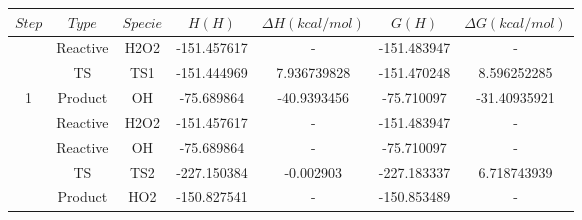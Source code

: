 \begin{tabular}{|c|c|c|c|c|c|c|}
    \hline
    \rowcolor[HTML]{000000} 
    {\color[HTML]{FFFFFF} \textbf{$Step$}} & {\color[HTML]{FFFFFF} \textbf{$Type$}} & {\color[HTML]{FFFFFF} \textbf{$Specie$}} & {\color[HTML]{FFFFFF} \textbf{$H(H)$}} & {\color[HTML]{FFFFFF} \textbf{$\Delta H (kcal/mol)$}} & {\color[HTML]{FFFFFF} \textbf{$G(H)$}} & {\color[HTML]{FFFFFF} \textbf{$\Delta G(kcal/mol)$}} \\ \hline
                                         & Reactive                             & H2O2                                   & -151.457617                       & -                                  & -151.483947                       & -                                  \\ \cline{2-7} 
                                         & TS                                   & TS1                                    & -151.444969                       & 7.936739828                        & -151.470248                       & 8.596252285                        \\ \cline{2-7} 
    \multirow{-3}{*}{1}                  & Product                              & OH                                     & -75.689864                        & -40.9393456                        & -75.710097                        & -31.40935921                       \\ \hline
                                         & Reactive                             & H2O2                                   & -151.457617                       & -                                  & -151.483947                       & -                                  \\ \cline{2-7} 
                                         & Reactive                             & OH                                     & -75.689864                        & -                                  & -75.710097                        & -                                  \\ \cline{2-7} 
                                         & TS                                   & TS2                                    & -227.150384                       & -0.002903                          & -227.183337                       & 6.718743939                        \\ \cline{2-7} 
                                         & Product                              & HO2                                    & -150.827541                       & -                                  & -150.853489                       & -                                  \\ \cline{2-7} 

\end{tabular}
